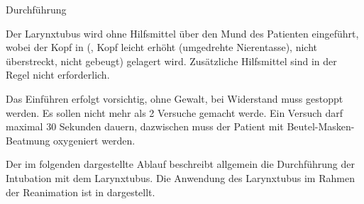 \Text
{Durchführung}
{Der
Larynxtubus wird ohne Hilfsmittel
über den Mund des Patienten eingeführt, wobei der Kopf
in  (, Kopf
  leicht erhöht (umgedrehte Nierentasse), nicht überstreckt,
  nicht gebeugt) gelagert wird. Zusätzliche Hilfsmittel
 sind in der Regel nicht erforderlich.

Das Einführen erfolgt vorsichtig, ohne Gewalt, bei
Widerstand muss gestoppt werden. Es sollen nicht mehr als 2
Versuche gemacht werde. Ein
Versuch darf maximal 30 Sekunden dauern, dazwischen muss der
Patient mit Beutel-Masken-Beatmung oxygeniert werden. 

Der im folgenden dargestellte Ablauf 
beschreibt allgemein die Durchführung der Intubation 
mit dem Larynxtubus.
%
Die Anwendung des Larynxtubus im Rahmen der Reanimation ist in  dargestellt. 

}
